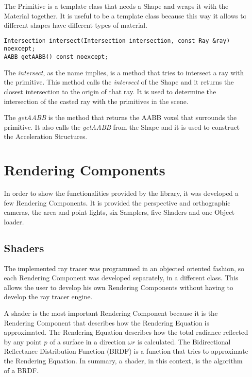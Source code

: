 \par
The Primitive is a template class that needs a Shape and wraps it with the Material together.
It is useful to be a template class because this way it allows to different shapes have different types of material.

\begin{lstlisting}[caption={Main methods in Primitive}, captionpos=b, label=Primitive]
Intersection intersect(Intersection intersection, const Ray &ray) noexcept;
AABB getAABB() const noexcept;
\end{lstlisting}

\par
The \textit{intersect}, as the name implies, is a method that tries to intersect a ray with the primitive.
This method calls the \textit{intersect} of the Shape and it returns the closest intersection to the origin of that ray.
It is used to determine the intersection of the casted ray with the primitives in the scene.

\par
The \textit{getAABB} is the method that returns the AABB voxel that surrounds the primitive.
It also calls the \textit{getAABB} from the Shape and it is used to construct the Acceleration Structures.


\section{Rendering Components}

\par
In order to show the functionalities provided by the library, it was developed a few Rendering Components.
It is provided the perspective and orthographic cameras, the area and point lights, six Samplers, five Shaders and one Object loader.

\subsection{Shaders}

\par
The implemented ray tracer was programmed in an objected oriented fashion, so each Rendering Component was developed separately, in a different class.
This allows the user to develop his own Rendering Components without having to develop the ray tracer engine.

\par
A shader is the most important Rendering Component because it is the Rendering Component that describes how the Rendering Equation is approximated.
The Rendering Equation describes how the total radiance reflected by any point
$p$
of a surface in a direction
$\omega$$r$
is calculated.
The Bidirectional Reflectance Distribution Function (BRDF) is a function that tries to approximate the Rendering Equation.
In summary, a shader, in this context, is the algorithm of a BRDF.

